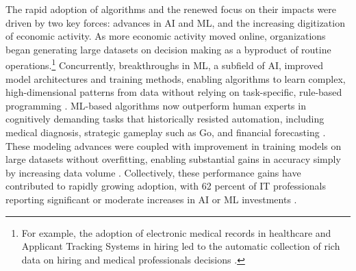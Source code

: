 \documentclass[11pt]{article}
\begin{document}
The rapid adoption of algorithms and the renewed focus on their impacts were driven by two key forces: advances in AI and ML, and the increasing digitization of economic activity. As more economic activity moved online, organizations began generating large datasets on decision making as a byproduct of routine operations.\footnote{For example, the adoption of electronic medical records in healthcare and Applicant Tracking Systems in hiring led to the automatic collection of rich data on hiring and medical professionals decisions \citep{li_hiring_2025, donnelly_systematic_2022}. } Concurrently, breakthroughs in ML, a subfield of AI, improved model architectures and training methods, enabling algorithms to learn complex, high-dimensional patterns from data without relying on task-specific, rule-based programming \citep{peter2021modern}. ML-based algorithms now outperform human experts in cognitively demanding tasks that historically resisted automation, including medical diagnosis, strategic gameplay such as Go, and financial forecasting \citep{mckinneybreastcancer2020, silver_mastering_2016, barboza_machine_2017}. These modeling advances were coupled with improvement in training models on large datasets without overfitting, enabling substantial gains in accuracy simply by increasing data volume \citep{halevy2009}. Collectively, these performance gains have contributed to rapidly growing adoption, with 62 percent of IT professionals reporting significant or moderate increases in AI or ML investments \citep{comptia}.


\end{document}
